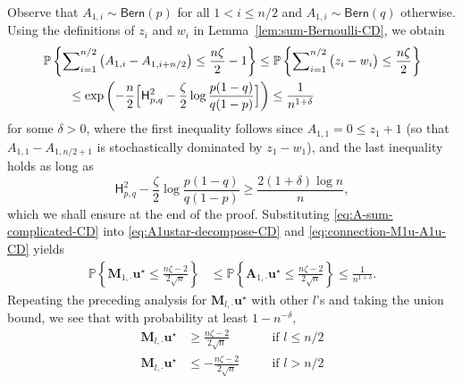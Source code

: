 Observe that $A_{1,i} \sim \mathsf{Bern}(p)$ for all $1< i\leq n/2$ and $A_{1,i} \sim \mathsf{Bern}(q)$ otherwise. Using the definitions of $z_i$ and $w_i$ in Lemma~\ref{lem:sum-Bernoulli-CD}, we obtain
%
\begin{align}
 & \mathbb{P}\left\{ \sum\nolimits_{i=1}^{n/2}\big(A_{1,i}-A_{1,i+n/2}\big)\leq\frac{n\zeta}{2}-1\right\}  
	\leq\mathbb{P}\left\{ \sum\nolimits_{i=1}^{n/2}\big(z_{i}-w_{i}\big)\leq\frac{n\zeta}{2}\right\}  \notag\\
	& \qquad \leq\exp\left(-\frac{n}{2}\Big[\mathsf{H}_{p,q}^{2}-\frac{\zeta}{2}\log\frac{p(1-q)}{q(1-p)}\Big]\right) \leq \frac{1}{n^{1+\delta}}
	\label{eq:A-sum-complicated-CD}
\end{align}
%
for some $\delta >0$, where the first inequality follows since $A_{1,1}=0\leq z_1+1$ (so that $A_{1,1}-A_{1,n/2+1}$ is stochastically dominated by $z_1 - w_1$), and the last inequality holds as long as
%
\begin{equation}
	\mathsf{H}_{p,q}^{2}-\frac{\zeta}{2}\log\frac{p(1-q)}{q(1-p)}
	\geq\frac{2(1+\delta)\log n}{n} ,
	\label{eq:H-pq-lower-bound-123}
\end{equation}
which we shall ensure at the end of the proof. Substituting \eqref{eq:A-sum-complicated-CD} into \eqref{eq:A1ustar-decompose-CD} and \eqref{eq:connection-M1u-A1u-CD} yields
\begin{align*}
\mathbb{P}\left\{ \bm{M}_{1,\cdot}\bm{u}^{\star}\leq \frac{n\zeta-2}{2\sqrt{n}} \right\}  
 & \leq \mathbb{P}\left\{ \bm{A}_{1,\cdot}\bm{u}^{\star}\leq\frac{n\zeta-2}{2\sqrt{n}} \right\} \leq\frac{1}{n^{1+\delta}}.
\end{align*}
%
%
%
Repeating the preceding analysis for $ \bm{M}_{l,\cdot}\bm{u}^{\star}$ with other  $l$'s  and taking the union bound, we see that with probability at least $1- n^{-\delta}$,
%
\begin{subequations}
	\label{eq:M-ustar-bound-CD}
\begin{align}
	\bm{M}_{l,\cdot}\bm{u}^{\star} &\geq \frac{n\zeta-2}{2\sqrt{n}}
	\quad  &&\text{if } l\leq {n}/{2} \\
	\bm{M}_{l,\cdot}\bm{u}^{\star}
	&\leq - \frac{n\zeta-2}{2\sqrt{n}}
	\quad  &&\text{if } l> n/2
\end{align}
\end{subequations}

